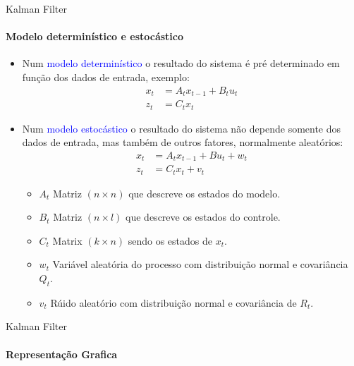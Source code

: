 \documentclass[aspectratio=169]{beamer}
\begin{document}
\begin{frame}{Kalman Filter}
    \framesubtitle{Modelo determinístico e estocástico}
    \begin{itemize}
        \item Num \textcolor{blue}{modelo determinístico} o resultado do sistema é pré determinado em função dos dados de entrada, exemplo:
        \begin{align*} 
            x_t &= A_t x_{t-1} + B_t u_t\\ 
            z_t &= C_t x_t
        \end{align*}
        \item Num \textcolor{blue}{modelo estocástico} o resultado do sistema não depende somente dos dados de entrada, mas também de outros fatores, normalmente
        aleatórios:
        \begin{align} 
            x_t &= A_t x_{t-1} + B u_t +  w_t\\ 
            z_t &= C_t x_t + v_t
        \end{align}
        \begin{itemize}
            \item $A_t$ Matriz $(n \times n)$ que descreve os estados do modelo.
            \item $B_t$ Matriz $(n \times l)$ que descreve os estados do controle.
            \item $C_t$ Matrix $(k\times n)$ sendo os estados de $x_t$.
            \item $ w_t$ Variável aleatória do processo com distribuição normal e covariância $Q_t$.
            \item $v_t$ Rúido aleatório com distribuição normal e covariância de $R_t$.
        \end{itemize}
    \end{itemize}
\end{frame}


\begin{frame}{Kalman Filter}
    \framesubtitle{Representação Grafica}
    
\end{frame}
\end{document}
